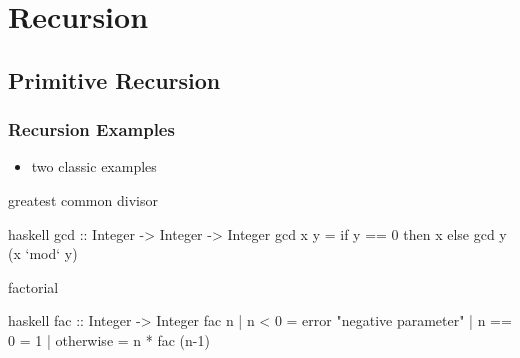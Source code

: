 \documentclass[dvipsnames]{beamer}
\theoremstyle{plain}
\begin{document}
\section{Recursion}

\subsection{Primitive Recursion}

\begin{frame}[fragile]
  \frametitle{Recursion Examples}

  \begin{itemize}
    \item two classic examples
  \end{itemize}

  \begin{exampleblock}{greatest common divisor}
    \begin{pygments}{haskell}
gcd :: Integer -> Integer -> Integer
gcd x y = if y == 0 then x else gcd y (x `mod` y)
    \end{pygments}
  \end{exampleblock}

  \pause
  \begin{exampleblock}{factorial}
    \begin{pygments}{haskell}
fac :: Integer -> Integer
fac n
  | n < 0     = error "negative parameter"
  | n == 0    = 1
  | otherwise = n * fac (n-1)
    \end{pygments}
  \end{exampleblock}
\end{frame}
\end{document}
